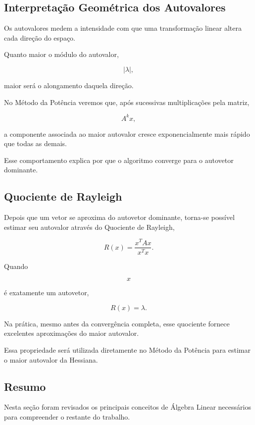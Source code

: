 \documentclass[12pt, a4paper]{article}
\begin{document}
\subsection{Interpretação Geométrica dos Autovalores}

Os autovalores medem a intensidade com que uma transformação linear altera
cada direção do espaço.

Quanto maior o módulo do autovalor,

\[
|\lambda|,
\]

maior será o alongamento daquela direção.

No Método da Potência veremos que, após sucessivas multiplicações pela matriz,

\[
A^k x,
\]

a componente associada ao maior autovalor cresce exponencialmente mais
rápido que todas as demais.

Esse comportamento explica por que o algoritmo converge para o autovetor
dominante.

\subsection{Quociente de Rayleigh}

Depois que um vetor se aproxima do autovetor dominante, torna-se possível
estimar seu autovalor através do Quociente de Rayleigh,

\[
R(x)
=
\frac{x^TAx}{x^Tx}.
\]

Quando

\[
x
\]

é exatamente um autovetor,

\[
R(x)=\lambda.
\]

Na prática, mesmo antes da convergência completa, esse quociente fornece
excelentes aproximações do maior autovalor.

Essa propriedade será utilizada diretamente no Método da Potência para
estimar o maior autovalor da Hessiana.

\subsection*{Resumo}

Nesta seção foram revisados os principais conceitos de Álgebra Linear
necessários para compreender o restante do trabalho.
\end{document}
